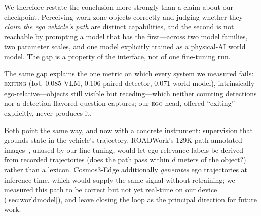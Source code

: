 We therefore restate the conclusion more strongly than a claim about our checkpoint.  Perceiving work-zone objects correctly and judging whether they \emph{claim the ego vehicle's path} are distinct capabilities, and the second is not reachable by prompting a model that has the first---across two model families, two parameter scales, and one model explicitly trained as a physical-AI world model.  The gap is a property of the interface, not of one fine-tuning run.

The same gap explains the one metric on which every system we measured fails: \textsc{exiting} (IoU 0.085 VLM, 0.106 paired detector, 0.071 world model), intrinsically ego-relative---objects still visible but receding---which neither counting detections nor a detection-flavored question captures; our \textsc{ego} head, offered ``exiting'' explicitly, never produces it.

Both point the same way, and now with a concrete instrument: supervision that grounds state in the vehicle's trajectory.  ROADWork's 129K path-annotated images~\cite{ghosh2025roadwork}, unused by our fine-tuning, would let ego-relevance labels be derived from recorded trajectories (does the path pass within $d$ meters of the object?) rather than a lexicon.  Cosmos3-Edge additionally \emph{generates} ego trajectories at inference time, which would supply the same signal without retraining; we measured this path to be correct but not yet real-time on our device (\cref{sec:worldmodel}), and leave closing the loop as the principal direction for future work.
